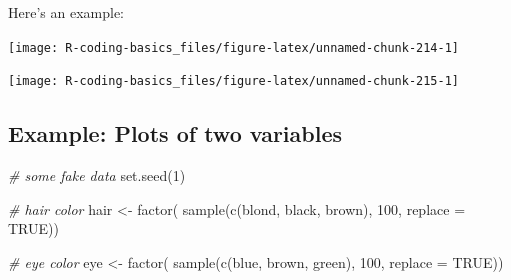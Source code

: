 \documentclass[
]{book}
\newenvironment{Shaded}{\begin{snugshade}}{\end{snugshade}}
\newcommand{\AttributeTok}[1]{\textcolor[rgb]{0.77,0.63,0.00}{#1}}
\newcommand{\CommentTok}[1]{\textcolor[rgb]{0.56,0.35,0.01}{\textit{#1}}}
\newcommand{\ConstantTok}[1]{\textcolor[rgb]{0.00,0.00,0.00}{#1}}
\newcommand{\DecValTok}[1]{\textcolor[rgb]{0.00,0.00,0.81}{#1}}
\newcommand{\FunctionTok}[1]{\textcolor[rgb]{0.00,0.00,0.00}{#1}}
\newcommand{\NormalTok}[1]{#1}
\newcommand{\OtherTok}[1]{\textcolor[rgb]{0.56,0.35,0.01}{#1}}
\newcommand{\SpecialCharTok}[1]{\textcolor[rgb]{0.00,0.00,0.00}{#1}}
\newcommand{\StringTok}[1]{\textcolor[rgb]{0.31,0.60,0.02}{#1}}
\begin{document}
Here's an example:

\begin{Shaded}
\end{Shaded}

\begin{center}\texttt{[image: R-coding-basics\_files/figure-latex/unnamed-chunk-214-1]} \end{center}

\begin{center}\texttt{[image: R-coding-basics\_files/figure-latex/unnamed-chunk-215-1]} \end{center}

\hypertarget{example-plots-of-two-variables}{%
\subsection{Example: Plots of two variables}\label{example-plots-of-two-variables}}

\begin{Shaded}
\begin{Highlighting}[]
\CommentTok{\# some fake data}
\FunctionTok{set.seed}\NormalTok{(}\DecValTok{1}\NormalTok{)}

\CommentTok{\# hair color}
\NormalTok{hair }\OtherTok{\textless{}{-}} \FunctionTok{factor}\NormalTok{(}
  \FunctionTok{sample}\NormalTok{(}\FunctionTok{c}\NormalTok{(}\StringTok{\textquotesingle{}blond\textquotesingle{}}\NormalTok{, }\StringTok{\textquotesingle{}black\textquotesingle{}}\NormalTok{, }\StringTok{\textquotesingle{}brown\textquotesingle{}}\NormalTok{), }\DecValTok{100}\NormalTok{, }\AttributeTok{replace =} \ConstantTok{TRUE}\NormalTok{))}

\CommentTok{\# eye color}
\NormalTok{eye }\OtherTok{\textless{}{-}} \FunctionTok{factor}\NormalTok{(}
  \FunctionTok{sample}\NormalTok{(}\FunctionTok{c}\NormalTok{(}\StringTok{\textquotesingle{}blue\textquotesingle{}}\NormalTok{, }\StringTok{\textquotesingle{}brown\textquotesingle{}}\NormalTok{, }\StringTok{\textquotesingle{}green\textquotesingle{}}\NormalTok{), }\DecValTok{100}\NormalTok{, }\AttributeTok{replace =} \ConstantTok{TRUE}\NormalTok{))}
\end{Highlighting}
\end{Shaded}
\end{document}
